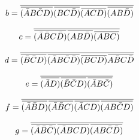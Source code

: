 \documentclass[12pt]{article}
\newcommand{\overbar}[1]{\mkern 1.5mu\overline{\mkern-1.5mu#1\mkern-1.5mu}\mkern 1.5mu} %
\begin{document}
\begin{equation}
b = \overline{\overbar{(\bar{A}B\bar{C}D)}\overbar{(BC\bar{D})}\overbar{(ACD)}\overbar{(AB\bar{D})}}
\end{equation}

\begin{equation}
c = \overline{\overbar{(\bar{A}\bar{B}C\bar{D})}\overbar{(AB\bar{D})}\overbar{(ABC)}}
\end{equation}

\begin{equation}
d = \overline{\overbar{(\bar{B}\bar{C}D)}\overbar{(\bar{A}B\bar{C}\bar{D})}\overbar{(BCD)}\overbar{A\bar{B}C\bar{D}}}
\end{equation}

\begin{equation}
e = \overline{\overbar{(\bar{A}D)}\overbar{(\bar{B}\bar{C}D)}\overbar{(\bar{A}B\bar{C})}}
\end{equation}

\begin{equation}
f = \overline{\overbar{(\bar{A}\bar{B}D)}\overbar{(\bar{A}\bar{B}C)}\overbar{(\bar{A}CD)}\overbar{(AB\bar{C}D)}}
\end{equation}

\begin{equation}
g = \overline{\overbar{(\bar{A}\bar{B}\bar{C})}\overbar{(\bar{A}BCD)}\overbar{(AB\bar{C}\bar{D})}}
\end{equation}
\end{document}
